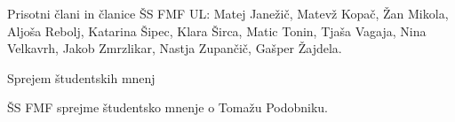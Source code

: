\documentclass{seja}
\begin{document}
Prisotni člani in članice ŠS FMF UL:
Matej Janežič, Matevž Kopač, Žan Mikola, Aljoša Rebolj, Katarina Šipec, Klara Širca, Matic Tonin, Tjaša Vagaja, Nina Velkavrh, Jakob Zmrzlikar, Nastja Zupančič, Gašper Žajdela.

\begin{red}
    \item
    Sprejem študentskih mnenj
\end{red}

\begin{ad}
    
    \begin{sklep*}
       ŠS FMF sprejme študentsko mnenje o Tomažu Podobniku.
    \end{sklep*}
   
\end{ad}
\makeatletter \global\let\@enddocumenthook\@empty \makeatother
{}
\end{document}
